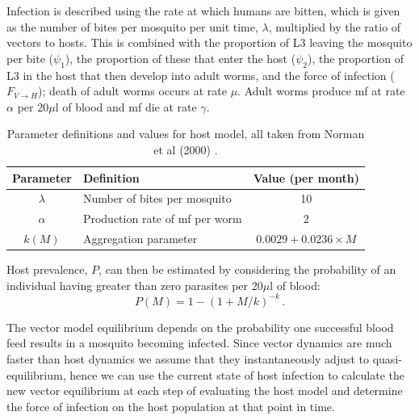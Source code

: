Infection is described using the rate at which humans are bitten, which is given as the number of bites per mosquito per unit time, $\lambda$, multiplied by the ratio of vectors to hosts. This is combined with the proportion of L3 leaving the mosquito per bite ($\psi_1$), the proportion of these that enter the host ($\psi_2$), the proportion of L3 in the host that then develop into adult worms, and the force of infection ($F_{V\rightarrow H}$); death of adult worms occurs at rate $\mu$. Adult worms produce mf at rate $\alpha$ per 20$\mu$l of blood and mf die at rate $\gamma$.

\begin{table}[t]
\caption[Host transmission model parameters.]{Parameter definitions and values for host model, all taken from Norman et al (2000) \cite{Norman2000_epifil}.}%
\vspace{.1cm}
\centering %
\begin{tabular}{c l c}%
\hline\hline                        %
Parameter & Definition & Value (per month) \\ [0.5ex]%
\hline                  %
$\lambda$ & Number of bites per mosquito & 10 \\%
$\alpha$ & Production rate of mf per worm & 2  \\
$k(M)$ & Aggregation parameter & $0.0029+0.0236\times M$ \\[1ex]      %
\hline%
\end{tabular}
\label{table:param_host}%
\end{table}

Host prevalence, $P$, can then be estimated by considering the probability of an individual having greater than zero parasites per 20$\mu$l of blood:
\begin{equation}
P(M) = 1 - (1+M/k)^{-k}\,.
\label{eqn:prev}
\end{equation}

The vector model equilibrium depends on the probability one successful blood feed results in a mosquito becoming infected. Since vector dynamics are much faster than host dynamics we assume that they instantaneously adjust to quasi-equilibrium, hence we can use the current state of host infection to calculate the new vector equilibrium at each step of evaluating the host model and determine the force of infection on the host population at that point in time.

